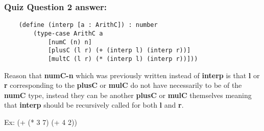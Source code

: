 \documentclass{article}
\begin{document}
\subsubsection*{Quiz Question 2 answer:}

\begin{verbatim}
    (define (interp [a : ArithC]) : number
        (type-case ArithC a
            [numC (n) n]
            [plusC (l r) (+ (interp l) (interp r))]
            [multC (l r) (* (interp l) (interp r))]))

\end{verbatim}
Reason that \textbf{numC-n} which was previously written instead of \textbf{interp} is that \textbf{l} or
\textbf{r} corresponding to the \textbf{plusC} or \textbf{mulC} do not have necessarily to be of the \textbf{numC}
type, instead they can be another \textbf{plusC} or  \textbf{mulC} themselves meaning that \textbf{interp} should
be recursively called for both \textbf{l} and \textbf{r}.

Ex: (+ (* 3 7) (+ 4 2))
\end{document}
